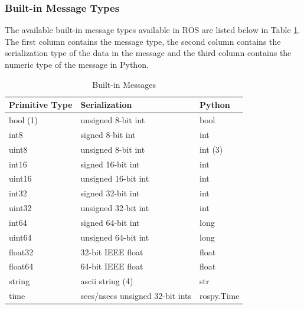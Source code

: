 \documentclass[twoside]{article}
\begin{document}
\subsubsection{Built-in Message Types}
The available built-in message types available in ROS are listed below in Table \ref{table:Built-in Messages}. The first column contains the message type, the second column contains the serialization type of the data in the message and the third column contains the numeric type of the message in Python.
\begin{table}[h]
\centering
\begin{tabular}{lll}
\hline
\textbf{Primitive Type} & \textbf{Serialization}          & \textbf{Python} \\ \hline
bool (1)                & unsigned 8-bit int              & bool            \\
int8                    & signed 8-bit int                & int             \\
uint8                   & unsigned 8-bit int              & int (3)         \\
int16                   & signed 16-bit int               & int             \\
uint16                  & unsigned 16-bit int             & int             \\
int32                   & signed 32-bit int               & int             \\
uint32                  & unsigned 32-bit int             & int             \\
int64                   & signed 64-bit int               & long            \\
uint64                  & unsigned 64-bit int             & long            \\
float32                 & 32-bit IEEE float               & float           \\
float64                 & 64-bit IEEE float               & float           \\
string                  & ascii string (4)                & str             \\
time                    & secs/nsecs unsigned 32-bit ints & rospy.Time      \\ \hline
\end{tabular}
\caption{Built-in Messages} \label{table:Built-in Messages}
\end{table}
\end{document}
